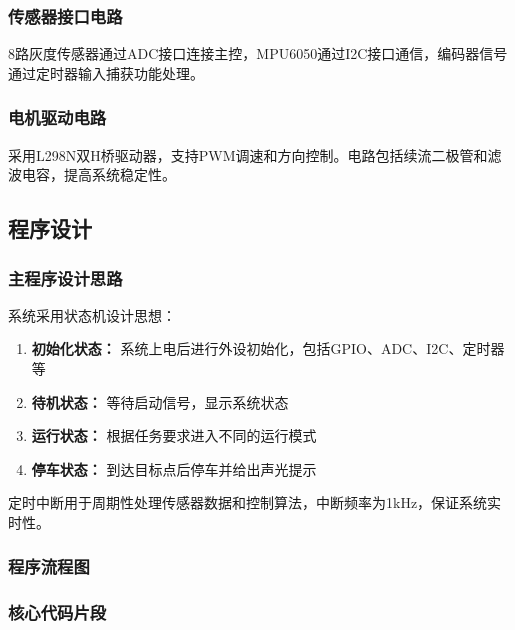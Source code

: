 \documentclass[UTF8]{ctexart}
\begin{document}
\subsubsection{传感器接口电路}

8路灰度传感器通过ADC接口连接主控，MPU6050通过I2C接口通信，编码器信号通过定时器输入捕获功能处理。

\subsubsection{电机驱动电路}

采用L298N双H桥驱动器，支持PWM调速和方向控制。电路包括续流二极管和滤波电容，提高系统稳定性。

\subsection{程序设计}

\subsubsection{主程序设计思路}

系统采用状态机设计思想：

\begin{enumerate}
    \item \textbf{初始化状态：} 系统上电后进行外设初始化，包括GPIO、ADC、I2C、定时器等
    \item \textbf{待机状态：} 等待启动信号，显示系统状态
    \item \textbf{运行状态：} 根据任务要求进入不同的运行模式
    \item \textbf{停车状态：} 到达目标点后停车并给出声光提示
\end{enumerate}

定时中断用于周期性处理传感器数据和控制算法，中断频率为1kHz，保证系统实时性。

\subsubsection{程序流程图}

\subsubsection{核心代码片段}
\end{document}
